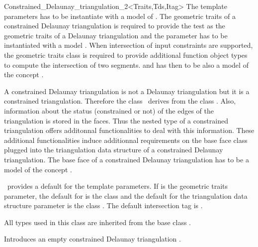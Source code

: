\begin{ccRefClass}{Constrained_Delaunay_triangulation_2<Traits,Tds,Itag>}
The template parameters  
has to be instantiate with a model of .
The geometric traits 
of a constrained Delaunay triangulation is required
to provide the  test as the geometric traits
of a Delaunay triangulation and the 
parameter has 
to be instantiated with a model
.
When intersection of input constraints are supported, 
the geometric traits class 
is required to provide additional function object  types
to compute the intersection of two segments.
and  has then to be also a model of the concept
.

A constrained Delaunay triangulation is not a Delaunay
triangulation but it is a constrained triangulation.
Therefore the class \ccRefName\ derives from
the class .
Also, information about the status (constrained or not)
of the edges of the triangulation is stored
in the faces. 
Thus the nested 
type of a constrained triangulation offers
additonnal functionalities to deal with this information.
These additional functionalities 
induce additionnal requirements on the base face class
plugged into the triangulation data structure of 
 a constrained Delaunay triangulation.
The base face of a constrained Delaunay triangulation
has to be a model of the concept
.

\cgal\ provides a default for the template parameters.
If  is the geometric traits
parameter,
the default  for
  is the class
and the default for the
triangulation data structure parameter is the class
.
The default intersection tag is .


\ccInheritsFrom {}

\ccTypes
All types used in this class are inherited from the base class
.



\ccCreation
{}  %

{Introduces an empty constrained Delaunay triangulation \ccVar.}


\end{ccRefClass}
